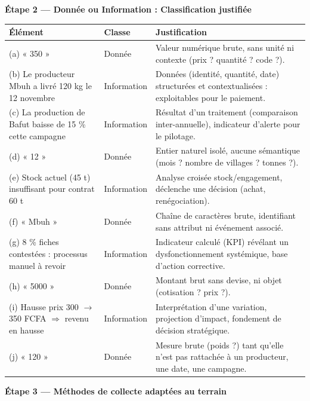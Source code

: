 \documentclass[11pt]{article}
\begin{document}
\begin{exoresolu}
\textbf{Étape 2 — Donnée ou Information : Classification justifiée}

\begin{center}
\begin{tabularx}{\linewidth}{|l|X|X|}
\hline
\rowcolor{popblueL} \textbf{Élément} & \textbf{Classe} & \textbf{Justification} \\
\hline
(a) « 350 » & Donnée & Valeur numérique brute, sans unité ni contexte (prix ? quantité ? code ?). \\
\hline
(b) Le producteur Mbuh a livré 120 kg le 12 novembre & Information & Données (identité, quantité, date) structurées et contextualisées : exploitables pour le paiement. \\
\hline
(c) La production de Bafut baisse de 15 \% cette campagne & Information & Résultat d'un traitement (comparaison inter-annuelle), indicateur d'alerte pour le pilotage. \\
\hline
(d) « 12 » & Donnée & Entier naturel isolé, aucune sémantique (mois ? nombre de villages ? tonnes ?). \\
\hline
(e) Stock actuel (45 t) insuffisant pour contrat 60 t & Information & Analyse croisée stock/engagement, déclenche une décision (achat, renégociation). \\
\hline
(f) « Mbuh » & Donnée & Chaîne de caractères brute, identifiant sans attribut ni événement associé. \\
\hline
(g) 8 \% fiches contestées : processus manuel à revoir & Information & Indicateur calculé (KPI) révélant un dysfonctionnement systémique, base d'action corrective. \\
\hline
(h) « 5000 » & Donnée & Montant brut sans devise, ni objet (cotisation ? prix ?). \\
\hline
(i) Hausse prix 300 $\to$ 350 FCFA $\Rightarrow$ revenu en hausse & Information & Interprétation d'une variation, projection d'impact, fondement de décision stratégique. \\
\hline
(j) « 120 » & Donnée & Mesure brute (poids ?) tant qu'elle n'est pas rattachée à un producteur, une date, une campagne. \\
\hline
\end{tabularx}
\end{center}

\textbf{Étape 3 — Méthodes de collecte adaptées au terrain}


\end{exoresolu}
\end{document}
